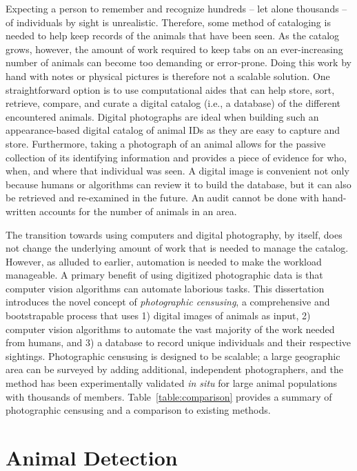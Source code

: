 Expecting a person to remember and recognize hundreds -- let alone thousands -- of individuals by sight is unrealistic. Therefore, some method of cataloging is needed to help keep records of the animals that have been seen.  As the catalog grows, however, the amount of work required to keep tabs on an ever-increasing number of animals can become too demanding or error-prone.  Doing this work by hand with notes or physical pictures is therefore not a scalable solution.  One straightforward option is to use computational aides that can help store, sort, retrieve, compare, and curate a digital catalog (i.e., a database) of the different encountered animals.  Digital photographs are ideal when building such an appearance-based digital catalog of animal IDs as they are easy to capture and store.  Furthermore, taking a photograph of an animal allows for the passive collection of its identifying information and provides a piece of evidence for who, when, and where that individual was seen.  A digital image is convenient not only because humans or algorithms can review it to build the database, but it can also be retrieved and re-examined in the future.  An audit cannot be done with hand-written accounts for the number of animals in an area.

The transition towards using computers and digital photography, by itself, does not change the underlying amount of work that is needed to manage the catalog. However, as alluded to earlier, automation is needed to make the workload manageable.  A primary benefit of using digitized photographic data is that computer vision algorithms can automate laborious tasks.  This dissertation introduces the novel concept of \textit{photographic censusing}, a comprehensive and bootstrapable process that uses 1) digital images of animals as input, 2) computer vision algorithms to automate the vast majority of the work needed from humans, and 3) a database to record unique individuals and their respective sightings.  Photographic censusing is designed to be scalable; a large geographic area can be surveyed by adding additional, independent photographers, and the method has been experimentally validated \textit{in situ} for large animal populations with thousands of members.  Table~\ref{table:comparison} provides a summary of photographic censusing and a comparison to existing methods.

\section{Animal Detection}

